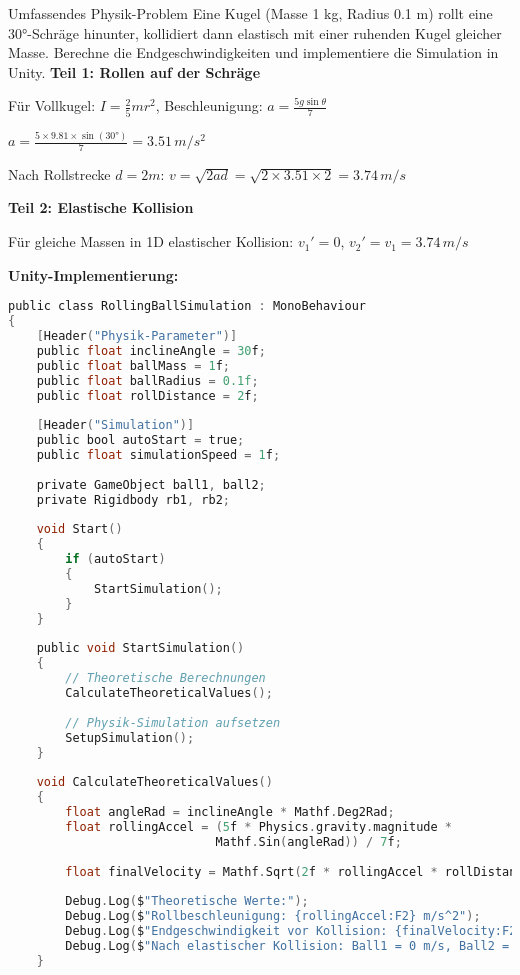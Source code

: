 \begin{example2}{Umfassendes Physik-Problem}
    Eine Kugel (Masse 1 kg, Radius 0.1 m) rollt eine 30°-Schräge hinunter, kollidiert dann elastisch mit einer ruhenden Kugel gleicher Masse. Berechne die Endgeschwindigkeiten und implementiere die Simulation in Unity.
    \tcblower
    \textbf{Teil 1: Rollen auf der Schräge}
    
    Für Vollkugel: $I = \frac{2}{5}mr^2$, Beschleunigung: $a = \frac{5g\sin\theta}{7}$
    
    $a = \frac{5 \times 9.81 \times \sin(30°)}{7} = 3.51 \, m/s^2$
    
    Nach Rollstrecke $d = 2m$: $v = \sqrt{2ad} = \sqrt{2 \times 3.51 \times 2} = 3.74 \, m/s$
    
    \textbf{Teil 2: Elastische Kollision}
    
    Für gleiche Massen in 1D elastischer Kollision:
    $v_1' = 0$, $v_2' = v_1 = 3.74 \, m/s$
    
    \textbf{Unity-Implementierung:}
\begin{lstlisting}[language=C, style=basesmol]
public class RollingBallSimulation : MonoBehaviour 
{
    [Header("Physik-Parameter")]
    public float inclineAngle = 30f;
    public float ballMass = 1f;
    public float ballRadius = 0.1f;
    public float rollDistance = 2f;
    
    [Header("Simulation")]
    public bool autoStart = true;
    public float simulationSpeed = 1f;
    
    private GameObject ball1, ball2;
    private Rigidbody rb1, rb2;
    
    void Start() 
    {
        if (autoStart) 
        {
            StartSimulation();
        }
    }
    
    public void StartSimulation() 
    {
        // Theoretische Berechnungen
        CalculateTheoreticalValues();
        
        // Physik-Simulation aufsetzen
        SetupSimulation();
    }
    
    void CalculateTheoreticalValues() 
    {
        float angleRad = inclineAngle * Mathf.Deg2Rad;
        float rollingAccel = (5f * Physics.gravity.magnitude * 
                             Mathf.Sin(angleRad)) / 7f;
        
        float finalVelocity = Mathf.Sqrt(2f * rollingAccel * rollDistance);
        
        Debug.Log($"Theoretische Werte:");
        Debug.Log($"Rollbeschleunigung: {rollingAccel:F2} m/s^2");
        Debug.Log($"Endgeschwindigkeit vor Kollision: {finalVelocity:F2} m/s");
        Debug.Log($"Nach elastischer Kollision: Ball1 = 0 m/s, Ball2 = {finalVelocity:F2} m/s");
    }
    

\end{lstlisting}
\end{example2}
